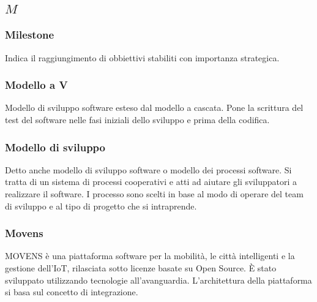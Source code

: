 \subsection*{\quad$M\quad$}

\subsubsection*{Milestone}
Indica il raggiungimento di obbiettivi stabiliti con importanza strategica. 

\subsubsection*{Modello a V}
Modello di sviluppo software esteso dal modello a cascata. Pone la scrittura del test del software nelle fasi iniziali dello sviluppo e prima della codifica.

\subsubsection*{Modello di sviluppo}
Detto anche modello di sviluppo software o modello dei processi software. Si tratta di un sistema di processi cooperativi e atti ad aiutare gli sviluppatori a realizzare il software. I processo sono scelti in base al modo di operare del team di sviluppo e al tipo di progetto che si intraprende.

\subsubsection*{Movens}
MOVENS è una piattaforma software per la mobilità, le città intelligenti e la gestione dell'IoT, rilasciata sotto licenze basate su Open Source. È stato sviluppato utilizzando tecnologie all'avanguardia. L'architettura della piattaforma si basa sul concetto di integrazione.

